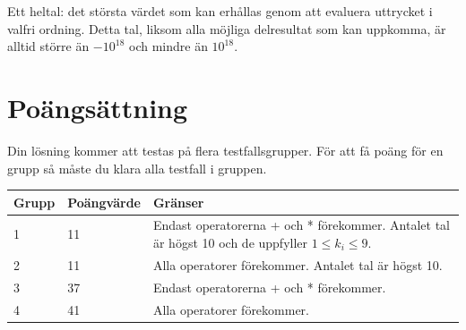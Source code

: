 Ett heltal: det största värdet som kan erhållas genom att evaluera uttrycket i valfri ordning. Detta tal, liksom alla möjliga delresultat som kan uppkomma, är alltid större än $-10^{18}$ och mindre än $10^{18}$.


\section*{Poängsättning}
Din lösning kommer att testas på flera testfallsgrupper. För att få poäng för en grupp
så måste du klara alla testfall i gruppen.

\begin{tabular}{| l | l | l |}
\hline
Grupp & Poängvärde & Gränser \\ \hline
1     & 11         & Endast operatorerna + och * förekommer. Antalet tal är högst 10 och de uppfyller $1\leq k_i \leq 9$. \\
2     & 11         & Alla operatorer förekommer. Antalet tal är högst 10. \\
3     & 37         & Endast operatorerna + och * förekommer.\\ 
4     & 41         & Alla operatorer förekommer. \\ \hline
\end{tabular}


